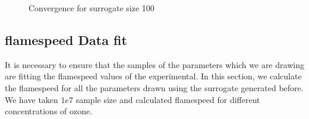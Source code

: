 \begin{figure}[H]
\centering
{}
    \caption{Convergence for surrogate size 100}
\end{figure}


\subsection{flamespeed Data fit}

\noindent It is necessary to ensure that the samples of the parameters which we are drawing are fitting the flamespeed values of the experimental. In this section, we calculate the flamespeed for all the parameters drawn using the surrogate generated before. We have taken $1e7$ sample size and calculated flamespeed for different concentrations of ozone. 

